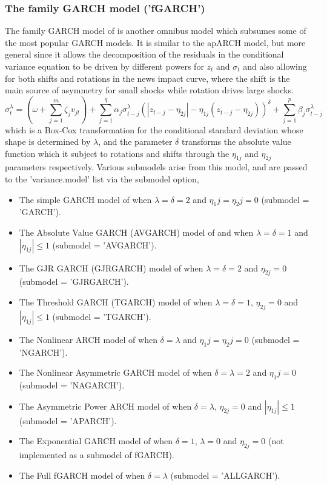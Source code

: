 \subsubsection{The family GARCH model ('fGARCH')}\label{section:fgarch}
The family GARCH model of \cite{Hentschel1995} is another omnibus model which
subsumes some of the most popular GARCH models. It is similar to the apARCH
model, but more general since it allows the decomposition of the residuals in
the conditional variance equation to be driven by different powers for $z_t$
and $\sigma_t$ and also allowing for both shifts and rotations in the news
impact curve, where the shift is the main source of asymmetry for small shocks
while rotation drives large shocks.
\begin{equation}\label{eq:fgarch}
\sigma _t^\lambda  = \left( {\omega  + \sum\limits_{j = 1}^m {{\zeta _j}{v_{jt}}} } \right) + \sum\limits_{j = 1}^q {{\alpha _j}\sigma _{t - j}^\lambda {{\left( {\left| {{z_{t - j}} - {\eta _{2j}}} \right| - {\eta _{1j}}\left( {{z_{t - j}} - {\eta _{2j}}} \right)} \right)}^\delta } + } \sum\limits_{j = 1}^p {{\beta _j}\sigma _{t - j}^\lambda }
\end{equation}
which is a Box-Cox transformation for the conditional standard deviation whose
shape is determined by $\lambda$, and the parameter $\delta$ transforms the
absolute value function which it subject to rotations and shifts through the
$\eta_{1j}$ and $\eta_{2j}$ parameters respectively. Various submodels arise
from this model, and are passed to the \verb@ugarchspec@ 'variance.model' list
via the submodel option,
\begin{itemize}
\item The simple GARCH model of \cite{Bollerslev1986} when $\lambda=\delta=2$ and $\eta_1j=\eta_2j=0$ (submodel = 'GARCH').
\item The Absolute Value GARCH (AVGARCH) model of \cite{Taylor1986} and \cite{Schwert1990} when $\lambda=\delta=1$ and $|{{\eta _{1j}}}| \leq 1$ (submodel = 'AVGARCH').
\item The GJR GARCH (GJRGARCH) model of \cite{Glosten1993} when $\lambda=\delta=2$ and $\eta_{2j}=0$ (submodel = 'GJRGARCH').
\item The Threshold GARCH (TGARCH) model of \cite{Zakoian1994} when $\lambda=\delta=1$, $\eta_{2j}=0$ and $|{{\eta _{1j}}}| \leq 1$ (submodel = 'TGARCH').
\item The Nonlinear ARCH model of \cite{Higgins1992} when $\delta=\lambda$ and  $\eta_1j=\eta_2j=0$ (submodel = 'NGARCH').
\item The Nonlinear Asymmetric GARCH model of \cite{Engle1993} when $\delta=\lambda=2$ and $\eta_1j=0$ (submodel = 'NAGARCH').
\item The Asymmetric Power ARCH model of \cite{Ding1993} when $\delta=\lambda$, $\eta_{2j}=0$ and $|{{\eta _{1j}}}| \leq 1$ (submodel = 'APARCH').
\item The Exponential GARCH model of \cite{Nelson1991} when $\delta=1$, $\lambda=0$ and $\eta_{2j}=0$ (not implemented as a submodel of fGARCH).
\item The Full fGARCH model of \cite{Hentschel1995} when $\delta=\lambda$ (submodel = 'ALLGARCH').
\end{itemize}
